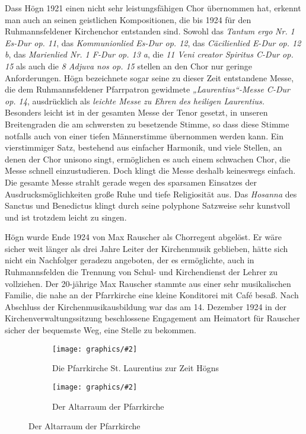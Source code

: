 \documentclass{book}
\newcommand{\img}[2][width=\linewidth]{\noindent\texttt{[image: graphics/\#2]}}
\begin{document}
Dass Högn 1921 einen nicht sehr leistungsfähigen Chor übernommen hat,
erkennt man auch an seinen geistlichen Kompositionen, die bis 1924 für
den Ruhmannsfeldener Kirchenchor entstanden sind. Sowohl das
\textit{Tantum ergo} \textit{Nr.} \textit{1 Es-Dur op. 11}, das
\textit{Kommunionlied Es-Dur op. 12}, das \textit{Cäcilienlied E-Dur
op. 12 b}, das \textit{Marienlied Nr. 1 F-Dur op. 13 a}, die \textit{11
Veni creator Spiritus C-Dur op. 15} als auch die \textit{8 Adjuva nos
op. 15} stellen an den Chor nur geringe Anforderungen. Högn bezeichnete
sogar seine zu dieser Zeit entstandene Messe, die dem
Ruhmannsfeldener Pfarrpatron gewidmete \textit{„Laurentius“-Messe
C-Dur op. 14}, ausdrücklich als \textit{leichte Messe zu Ehren des
heiligen Laurentius.} Besonders leicht ist in der gesamten Messe der
Tenor gesetzt, in unseren Breitengraden die am schwersten zu besetzende
Stimme, so dass diese Stimme notfalls auch von einer tiefen
Männerstimme übernommen werden kann. Ein vierstimmiger Satz, bestehend
aus einfacher Harmonik, und viele Stellen, an denen der Chor unisono
singt, ermöglichen es auch einem schwachen Chor, die Messe schnell
einzustudieren. Doch klingt die Messe deshalb keineswegs einfach. Die
gesamte Messe strahlt gerade wegen des sparsamen Einsatzes der
Ausdrucksmöglichkeiten große Ruhe und tiefe Religiosität aus. Das
\textit{Hosanna} des Sanctus und Benedictus klingt durch seine
polyphone Satzweise sehr kunstvoll und ist trotzdem leicht zu singen.

Högn wurde Ende 1924 von Max Rauscher als Chorregent abgelöst. Er wäre
sicher weit länger als drei Jahre Leiter der Kirchenmusik geblieben,
hätte sich nicht ein Nachfolger geradezu angeboten, der es ermöglichte,
auch in Ruhmannsfelden die Trennung von Schul- und Kirchendienst der
Lehrer zu vollziehen. Der 20-jährige Max Rauscher stammte aus einer
sehr musikalischen Familie, die nahe an der Pfarrkirche eine kleine
Konditorei mit Café besaß. Nach Abschluss der Kirchenmusikausbildung
war das am 14. Dezember 1924 in der Kirchenverwaltungssitzung
beschlossene Engagement am Heimatort für Rauscher sicher der bequemste
Weg, eine Stelle zu bekommen.

\begin{figure}
\begin{subfigure}[b]{0.5\linewidth}
\img{Pfarrkirche}
\caption{Die Pfarrkirche St. Laurentius zur Zeit Högns}
\end{subfigure}
\begin{subfigure}[b]{0.5\linewidth}
\img{Pfarrkirche-Altarraum}
\caption{Der Altarraum der Pfarrkirche}	
\end{subfigure}
\end{figure}
\end{document}
